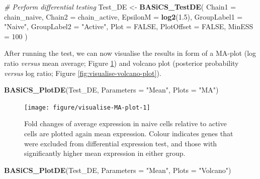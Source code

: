 \documentclass[9pt,a4paper,]{extarticle}
\newenvironment{Shaded}{\begin{snugshade}}{\end{snugshade}}
\newcommand{\CommentTok}[1]{\textcolor[rgb]{0.56,0.35,0.01}{\textit{#1}}}
\newcommand{\DataTypeTok}[1]{\textcolor[rgb]{0.13,0.29,0.53}{#1}}
\newcommand{\DecValTok}[1]{\textcolor[rgb]{0.00,0.00,0.81}{#1}}
\newcommand{\FloatTok}[1]{\textcolor[rgb]{0.00,0.00,0.81}{#1}}
\newcommand{\KeywordTok}[1]{\textcolor[rgb]{0.13,0.29,0.53}{\textbf{#1}}}
\newcommand{\NormalTok}[1]{#1}
\newcommand{\OtherTok}[1]{\textcolor[rgb]{0.56,0.35,0.01}{#1}}
\newcommand{\StringTok}[1]{\textcolor[rgb]{0.31,0.60,0.02}{#1}}
\begin{document}
\begin{Shaded}
\begin{Highlighting}[]
\CommentTok{# Perform differential testing}
\NormalTok{Test_DE <-}\StringTok{ }\KeywordTok{BASiCS_TestDE}\NormalTok{(}
  \DataTypeTok{Chain1 =}\NormalTok{ chain_naive,}
  \DataTypeTok{Chain2 =}\NormalTok{ chain_active,}
  \DataTypeTok{EpsilonM =} \KeywordTok{log2}\NormalTok{(}\FloatTok{1.5}\NormalTok{),}
  \DataTypeTok{GroupLabel1 =} \StringTok{"Naive"}\NormalTok{,}
  \DataTypeTok{GroupLabel2 =} \StringTok{"Active"}\NormalTok{,}
  \DataTypeTok{Plot =} \OtherTok{FALSE}\NormalTok{,}
  \DataTypeTok{PlotOffset =} \OtherTok{FALSE}\NormalTok{,}
  \DataTypeTok{MinESS =} \DecValTok{100}
\NormalTok{)}
\end{Highlighting}
\end{Shaded}

After running the test, we can now visualise the results in form of a MA-plot
(log ratio \emph{versus} mean average; Figure \ref{fig:visualise-MA-plot})
and volcano plot (posterior probability \emph{versus} log ratio; Figure
\ref{fig:visualise-volcano-plot}).

\begin{Shaded}
\begin{Highlighting}[]
\KeywordTok{BASiCS_PlotDE}\NormalTok{(Test_DE, }\DataTypeTok{Parameters =} \StringTok{"Mean"}\NormalTok{, }\DataTypeTok{Plots =} \StringTok{"MA"}\NormalTok{)}
\end{Highlighting}
\end{Shaded}

\begin{figure}

{\centering \texttt{[image: figure/visualise-MA-plot-1]} 

}

\caption{Fold changes of average expression in naive cells relative to active cells are plotted again mean expression. Colour indicates genes that were excluded from differential expression test, and those with significantly higher mean expression in either group.}\label{fig:visualise-MA-plot}
\end{figure}

\begin{Shaded}
\begin{Highlighting}[]
\KeywordTok{BASiCS_PlotDE}\NormalTok{(Test_DE, }\DataTypeTok{Parameters =} \StringTok{"Mean"}\NormalTok{, }\DataTypeTok{Plots =} \StringTok{"Volcano"}\NormalTok{)}
\end{Highlighting}
\end{Shaded}
\end{document}
